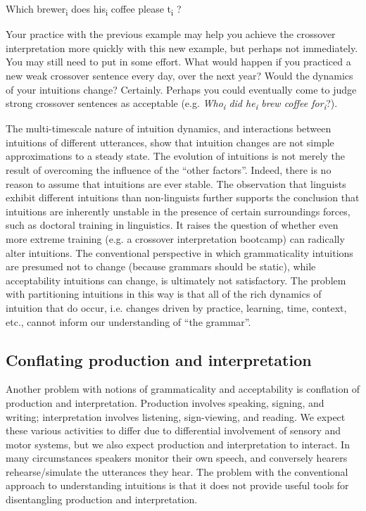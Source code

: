 \ea
Which brewer\textsubscript{i} does his\textsubscript{i} coffee please t\textsubscript{i}
\z?

  Your practice with the previous example may help you achieve the crossover interpretation more quickly with this new example, but perhaps not immediately. You may still need to put in some effort. What would happen if you practiced a new weak crossover sentence every day, over the next year? Would the dynamics of your intuitions change? Certainly. Perhaps you could eventually come to judge strong crossover sentences as acceptable (e.g. \textit{Who\textsubscript{i} did he\textsubscript{i} brew coffee for\textsubscript{i}}?). 

  The multi-timescale nature of intuition dynamics, and interactions between intuitions of different utterances, show that intuition changes are not simple approximations to a steady state. The evolution of intuitions is not merely the result of overcoming the influence of the “other factors”. Indeed, there is no reason to assume that intuitions are ever stable. The observation that linguists exhibit different intuitions than non-linguists \citep{Spencer1973} further supports the conclusion that intuitions are inherently unstable in the presence of certain surroundings forces, such as doctoral training in linguistics. It raises the question of whether even more extreme training (e.g. a crossover interpretation bootcamp) can radically alter intuitions. The conventional perspective in which grammaticality intuitions are presumed not to change (because grammars should be static), while acceptability intuitions can change, is ultimately not satisfactory. The problem with partitioning intuitions in this way is that all of the rich dynamics of intuition that do occur, i.e. changes driven by practice, learning, time, context, etc., cannot inform our understanding of “the grammar”.

\subsection{Conflating production and interpretation}

Another problem with notions of grammaticality and acceptability is conflation of production and interpretation. Production involves speaking, signing, and writing; interpretation involves listening, sign-viewing, and reading. We expect these various activities to differ due to differential involvement of sensory and motor systems, but we also expect production and interpretation to interact. In many circumstances speakers monitor their own speech, and conversely hearers rehearse/simulate the utterances they hear. The problem with the conventional approach to understanding intuitions is that it does not provide useful tools for disentangling production and interpretation.

